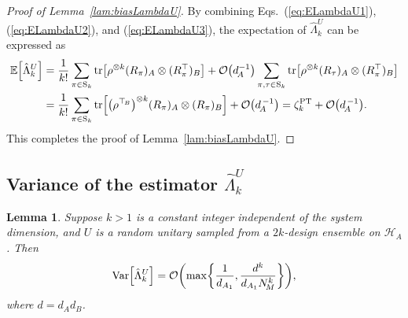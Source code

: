 \documentclass[aps,prl,twocolumn,nofootinbib,superscriptaddress,10pt]{revtex4-2}
\let\originalleft\left
\let\originalright\right
\renewcommand{\left}{\mathopen{}\mathclose\bgroup\originalleft}
\renewcommand{\right}{\aftergroup\egroup\originalright}
\def\E{ {\mathbb E} } %
\DeclareMathOperator{\Var}{Var}
\DeclareMathOperator{\Tr}{tr}
\newcommand{\bigo}[1]{\mathcal{O}\left(#1\right)}
\theoremstyle{plain}
\newtheorem{lemma}{Lemma}
\theoremstyle{definition}
\newcommand{\PT}{\mathrm{PT}}
\newcommand{\caH}{\mathcal{H}}
\def\eqref#1{\textup{(\ref{#1})}}
\newcommand{\lref}[1]{Lemma~\ref{#1}}
\begin{document}
\begin{proof}[Proof of \lref{lam:biasLambdaU}]
By combining Eqs.~\eqref{eq:ELambdaU1}, \eqref{eq:ELambdaU2}, and \eqref{eq:ELambdaU3}, 
the expectation of $\hat{\Lambda}_k^{U}$ can be expressed as 
\begin{align}
\E \left[ \hat{\Lambda}_k^{U} \right] 
&=  \frac{1}{k!} \sum_{\pi\in \mathrm{S}_k} \Tr \left[ \rho^{\otimes k} (R_\pi)_A \otimes (R_\pi^\top)_B \right] 
+ \bigo{d_{\!A}^{-1}} \sum_{\pi, \tau \in \mathrm{S}_k} \Tr \left[ \rho^{\otimes k} 
(R_\tau)_{A} \otimes (R_\pi^\top)_B \right] 
\nonumber \\
&= \frac{1}{k!} \sum_{\pi\in \mathrm{S}_k} \Tr \left[ \left( \rho^{\top_{\!B}}\right)^{\otimes k} (R_\pi)_A \otimes (R_\pi)_B \right] 
+ \bigo{d_{\!A}^{\,-1}}
= \zeta_k^{\PT} + \bigo{d_{\!A}^{\,-1}} .
\end{align}
This completes the proof of \lref{lam:biasLambdaU}. 
\end{proof}


\subsection{Variance of the estimator \texorpdfstring{$\hat{\Lambda}_k^{U}$}{}}\label{sec:VarPTmoment}

\begin{lemma}\label{lem:PTVariance}
Suppose $k>1$ is a constant integer independent of the system dimension, and $U$ is a random unitary  sampled from a $2k$-design ensemble on $\caH_A$. Then 
\begin{align}
\Var\left[\hat{\Lambda}_k^{U} \right] 
= \bigo{\max\left\lbrace \frac{1}{d_{A_1}} ,\frac{d^{k}}{d_{A_1} N_{\!M}^{k}}\right\rbrace  } ,
\end{align}
where $d=d_Ad_B$. 
\end{lemma}
\end{document}
